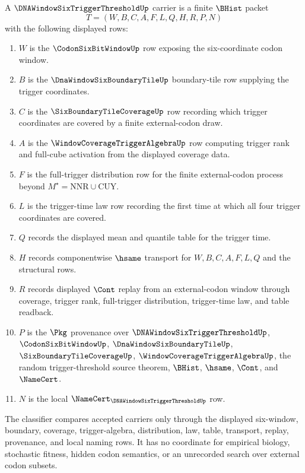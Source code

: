 \begin{definition}
\label{def:dna-window-six-trigger-threshold-carrier}
A $\DNAWindowSixTriggerThresholdUp$ carrier is a finite $\BHist$ packet
$$
T=(W,B,C,A,F,L,Q,H,R,P,N)
$$
with the following displayed rows:
\begin{enumerate}
\item $W$ is the $\CodonSixBitWindowUp$ row exposing the six-coordinate codon
window.
\item $B$ is the $\DnaWindowSixBoundaryTileUp$ boundary-tile row supplying the
trigger coordinates.
\item $C$ is the $\SixBoundaryTileCoverageUp$ row recording which trigger
coordinates are covered by a finite external-codon draw.
\item $A$ is the $\WindowCoverageTriggerAlgebraUp$ row computing trigger rank
and full-cube activation from the displayed coverage data.
\item $F$ is the full-trigger distribution row for the finite external-codon
process beyond $M^{\star}=\mathrm{NNR}\cup\mathrm{CUY}$.
\item $L$ is the trigger-time law row recording the first time at which all
four trigger coordinates are covered.
\item $Q$ records the displayed mean and quantile table for the trigger time.
\item $H$ records componentwise $\hsame$ transport for $W,B,C,A,F,L,Q$ and
the structural rows.
\item $R$ records displayed $\Cont$ replay from an external-codon window
through coverage, trigger rank, full-trigger distribution, trigger-time law,
and table readback.
\item $P$ is the $\Pkg$ provenance over $\DNAWindowSixTriggerThresholdUp$,
$\CodonSixBitWindowUp$, $\DnaWindowSixBoundaryTileUp$,
$\SixBoundaryTileCoverageUp$, $\WindowCoverageTriggerAlgebraUp$, the random
trigger-threshold source theorem, $\BHist$, $\hsame$, $\Cont$, and
$\NameCert$.
\item $N$ is the local $\NameCert_{\DNAWindowSixTriggerThresholdUp}$ row.
\end{enumerate}
The classifier compares accepted carriers only through the displayed
six-window, boundary, coverage, trigger-algebra, distribution, law, table,
transport, replay, provenance, and local naming rows. It has no coordinate
for empirical biology, stochastic fitness, hidden codon semantics, or an
unrecorded search over external codon subsets.
\end{definition}

